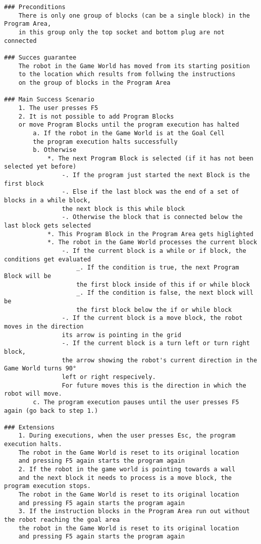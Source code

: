 \documentclass{article}
\begin{document}
\begin{verbatim}
### Preconditions
    There is only one group of blocks (can be a single block) in the Program Area, 
    in this group only the top socket and bottom plug are not connected 

### Succes guarantee
    The robot in the Game World has moved from its starting position 
    to the location which results from follwing the instructions 
    on the group of blocks in the Program Area

### Main Success Scenario
    1. The user presses F5
    2. It is not possible to add Program Blocks 
    or move Program Blocks until the program execution has halted
        a. If the robot in the Game World is at the Goal Cell
        the program execution halts successfully
        b. Otherwise
            *. The next Program Block is selected (if it has not been selected yet before)
                -. If the program just started the next Block is the first block
                -. Else if the last block was the end of a set of blocks in a while block,
                the next block is this while block
                -. Otherwise the block that is connected below the last block gets selected
            *. This Program Block in the Program Area gets higlighted
            *. The robot in the Game World processes the current block
                -. If the current block is a while or if block, the conditions get evaluated
                    _. If the condition is true, the next Program Block will be 
                    the first block inside of this if or while block
                    _. If the condition is false, the next block will be 
                    the first block below the if or while block
                -. If the current block is a move block, the robot moves in the direction
                its arrow is pointing in the grid
                -. If the current block is a turn left or turn right block, 
                the arrow showing the robot's current direction in the Game World turns 90°
                left or right respecively. 
                For future moves this is the direction in which the robot will move.
        c. The program execution pauses until the user presses F5 again (go back to step 1.)
 
### Extensions
    1. During executions, when the user presses Esc, the program execution halts. 
    The robot in the Game World is reset to its original location 
    and pressing F5 again starts the program again
    2. If the robot in the game world is pointing towards a wall 
    and the next block it needs to process is a move block, the program execution stops. 
    The robot in the Game World is reset to its original location 
    and pressing F5 again starts the program again
    3. If the instruction blocks in the Program Area run out without the robot reaching the goal area
    the robot in the Game World is reset to its original location 
    and pressing F5 again starts the program again
\end{verbatim}
\end{document}
